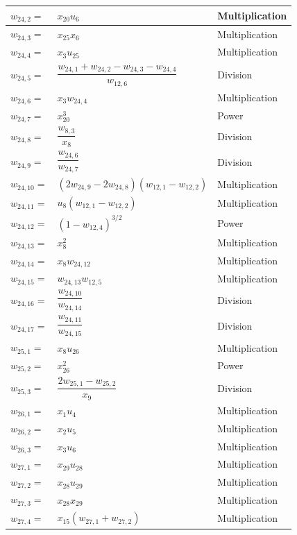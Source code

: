 \begin{longtable}{|p{1.5cm}|l|p{2cm}|}
$w_{24,2}=$ & $ x_{20}u_{6} $ & Multiplication \\ \hline
$w_{24,3}=$ & $ x_{25}x_{6} $ & Multiplication \\ \hline
$w_{24,4}=$ & $ x_{3}u_{25} $ & Multiplication \\ \hline
$w_{24,5}=$ & $ \dfrac{w_{24,1}+w_{24,2}-w_{24,3}-w_{24,4}}{w_{12,6}} $ & Division \\ \hline
$w_{24,6}=$ & $ x_{3}w_{24,4} $ & Multiplication \\ \hline
$w_{24,7}=$ & $ x_{20}^{3} $ & Power \\ \hline
$w_{24,8}=$ & $ \dfrac{w_{8,3}}{x_{8}} $ & Division \\ \hline
$w_{24,9}=$ & $ \dfrac{w_{24,6}}{w_{24,7}} $ & Division \\ \hline
$w_{24,10}=$ & $ \left(2w_{24,9}-2w_{24,8}\right)\left(w_{12,1}-w_{12,2}\right) $ & Multiplication \\ \hline
$w_{24,11}=$ & $ u_{8}\left(w_{12,1}-w_{12,2}\right) $ & Multiplication \\ \hline
$w_{24,12}=$ & $ \left(1-w_{12,4}\right)^{3/2} $ & Power \\ \hline
$w_{24,13}=$ & $ x_{8}^{2} $ & Multiplication \\ \hline
$w_{24,14}=$ & $ x_{8}w_{24,12} $ & Multiplication \\ \hline
$w_{24,15}=$ & $ w_{24,13}w_{12,5} $ & Multiplication \\ \hline
$w_{24,16}=$ & $ \dfrac{w_{24,10}}{w_{24,14}} $ & Division \\ \hline
$w_{24,17}=$ & $ \dfrac{w_{24,11}}{w_{24,15}} $ & Division \\ \hline
$w_{25,1}=$ & $ x_{8}u_{26} $ & Multiplication \\ \hline
$w_{25,2}=$ & $ x_{26}^{2} $ & Power \\ \hline
$w_{25,3}=$ & $ \dfrac{2w_{25,1}-w_{25,2}}{x_{9}} $ & Division  \\ \hline
$w_{26,1}=$ & $ x_{1}u_{4} $ & Multiplication \\ \hline
$w_{26,2}=$ & $ x_{2}u_{5} $ & Multiplication \\ \hline
$w_{26,3}=$ & $ x_{3}u_{6} $ & Multiplication \\ \hline
$w_{27,1}=$ & $ x_{29}u_{28} $ & Multiplication \\ \hline
$w_{27,2}=$ & $ x_{28}u_{29} $ & Multiplication \\ \hline
$w_{27,3}=$ & $ x_{28}x_{29} $ & Multiplication \\ \hline
$w_{27,4}=$ & $ x_{15}\left(w_{27,1}+w_{27,2}\right) $ & Multiplication \\ \hline

\end{longtable}
